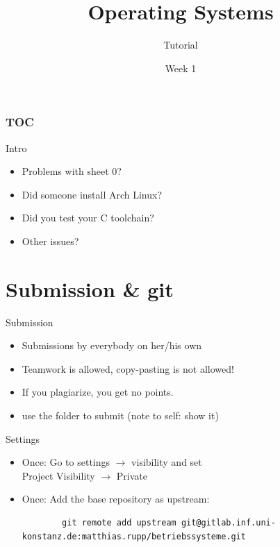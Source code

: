 \documentclass[10pt]{beamer}
\title{\textbf{Operating Systems}}
\subtitle{Tutorial}
\date{Week 1}
\begin{document}
\frame{\titlepage}

\begin{frame}
  \frametitle{TOC}
  \tableofcontents[hideallsubsections]
\end{frame}

\begin{frame}{Intro}
\begin{itemize}
 \item Problems with sheet 0?
 \item Did someone install Arch Linux?
 \item Did you test your C toolchain?
 \item Other issues?
\end{itemize}
\end{frame}

\section{Submission \& git}
    \frame{\sectionpage}
    \begin{frame}{Submission}
        \begin{itemize}
        \item Submissions by everybody on her/his own
        \item Teamwork is allowed, \alert{copy-pasting is not allowed!}
        \item If you plagiarize, you get no points.
        \item use the folder to submit (note to self: show it)
        \end{itemize}
    \end{frame}
    
    \begin{frame}[fragile]{Settings}      
     \begin{itemize}
      \item Once: Go to settings $\rightarrow$ visibility and set \\
      \alert{Project Visibility $\rightarrow$ Private} \vspace{0.2cm} \\
      \item Once: Add the base repository as upstream: \vspace{0.2cm} \\
           \begin{verbatim}
        git remote add upstream git@gitlab.inf.uni-konstanz.de:matthias.rupp/betriebssysteme.git
      \end{verbatim} 
      \vspace{0.2cm}
              \end{itemize}
      \end{frame}
      
\end{document}
